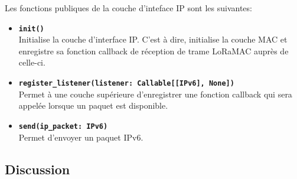         Les fonctions publiques de la couche d'inteface IP sont les suivantes:
        \begin{itemize}
            \item \textbf{\texttt{init()}}\\Initialise la couche d'interface IP. C'est à dire, initialise la couche MAC et enregistre sa fonction callback de réception de trame LoRaMAC auprès de celle-ci.
            \item \textbf{\texttt{register\_listener(listener: Callable[[IPv6], None])}}\\
            Permet à une couche supérieure d'enregistrer une fonction callback qui sera appelée lorsque un paquet est disponible.
            \item \textbf{\texttt{send(ip\_packet: IPv6)}}\\
            Permet d'envoyer un paquet IPv6.
        \end{itemize}


\subsection*{Discussion}
